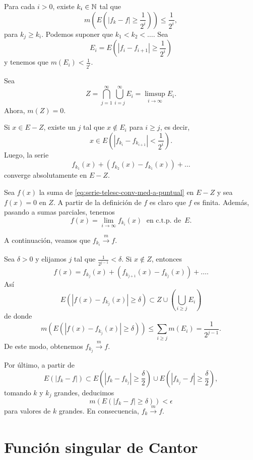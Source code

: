 \begin{demo}
Para cada $i>0$, existe $k_i\in \mathbb{N}$ tal que 
\[
m\left(E\left(|f_k-f|\geq \frac{1}{2^i}\right)\right)\leq
\frac{1}{2^i},
\]
para $k_j\geq k_i$.
Podemos suponer que $k_1<k_2<\ldots$. Sea 
\[
E_i=E\left(   |f_{i} -f_{i+1}|\geq \frac{1}{2^i}\right)
\]
y tenemos que $m(E_i)<\frac{1}{2^i}$. 

Sea 
\[ Z=\bigcap\limits_{j=1}^{\infty}\bigcup\limits_{i=j}^{\infty} E_i
=\limsup\limits_{i \to \infty} E_i.
\]
Ahora, $m(Z)=0$. 

Si $x \in E-Z$, existe un $j$ tal que $x \notin E_i$ para $i\geq j$, es decir, 
\[
x\in E\left( \left|f_{k_i}-f_{k_{i+1}}\right|<\frac{1}{2^i}\right).
\]
Luego, la serie
\begin{equation}\label{eq:serie-telesc-conv-med-a-puntual}
f_{k_1}(x)+\left(f_{k_2}(x)-f_{k_1}(x)\right)+\ldots
\end{equation}
converge absolutamente en $E-Z$.

Sea $f(x)$ la suma de \eqref{eq:serie-telesc-conv-med-a-puntual} en $E-Z$ y sea $f(x)=0$ en $Z$. A partir de la definici\'on de $f$ es claro que $f$ es finita. Adem\'as, pasando a sumas parciales, tenemos
\[
f(x)=\lim\limits_{i \to \infty} f_{k_i}(x)\;\mbox{ en c.t.p. de } \,E.
\]

A continuaci\'on, veamos que $f_{k_i} \xrightarrow[]{m} f$.

Sea $\delta>0$ y elijamos $j$ tal que $\frac{1}{2^{j-1}}<\delta$. 
Si  $x\notin Z$, entonces 
\[
f(x)=
f_{k_j}(x)+\left(f_{k_{j+1}}(x)-f_{k_j}(x)\right)+\ldots.
\]
As\'i
\[
E\left(\left|f(x)-f_{k_j}(x)  \right|\geq \delta\right)\subset 
Z\cup \left(\bigcup\limits_{i\geq j} E_i\right)
\]
de donde
\[
m\left(
E\left(\left|f(x)-f_{k_j}(x)  \right|\geq \delta\right)
\right)
\leq \sum\limits_{i\geq j} m(E_i)=\frac{1}{2^{j-1}}.
\]
De este modo, obtenemos $f_{k_j} \xrightarrow[]{m} f$.

Por \'ultimo, a partir de 
\[
E\left(|f_k-f|\right)\subset 
E\left(|f_k -f_{k_j}|\geq \frac{\delta}{2}\right) \cup
E\left(|f_{k_j} -f|\geq \frac{\delta}{2}\right),
\]
tomando $k$ y $k_j$ grandes, deducimos
\[
m\left(E\left(\left|f_k-f\right|\geq \delta\right)\right)< \epsilon
\]
para valores de $k$ grandes. En consecuencia, $f_k \xrightarrow[]{m}f$.
\end{demo}

\section{Funci\'on singular de Cantor}

